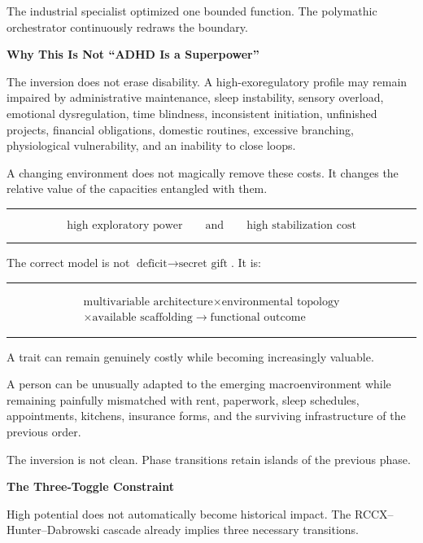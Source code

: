\documentclass[10pt]{article}
\newcommand{\ActiveAccent}{Industrial}
\newcommand{\papersection}[2]{%
  \Needspace{8\baselineskip}
  \vspace{1.1em}
  \noindent\begin{minipage}[t]{0.12\textwidth}
    \vspace{1pt}{\sffamily\bfseries\fontsize{17}{17}\selectfont\textcolor{\ActiveAccent}{#1}}
  \end{minipage}%
  \begin{minipage}[t]{0.86\textwidth}
    {\sffamily\bfseries\fontsize{16.2}{19}\selectfont #2}\par
    \vspace{0.35em}{\color{\ActiveAccent}\rule{\linewidth}{1.15pt}}
  \end{minipage}
  \vspace{0.55em}
}
\newenvironment{equationpanel}{\begin{center}\begin{minipage}{0.92\linewidth}\color{\ActiveAccent}\rule{\linewidth}{0.55pt}\par\vspace{-0.25em}\color{Ink}}{\vspace{-0.10em}\par\color{\ActiveAccent}\rule{\linewidth}{0.55pt}\end{minipage}\end{center}}
\begin{document}
The industrial specialist optimized one bounded function. The polymathic orchestrator continuously redraws the boundary.

\papersection{VIII}{Why This Is Not ``ADHD Is a Superpower''}

The inversion does not erase disability. A high-exoregulatory profile may remain impaired by administrative maintenance, sleep instability, sensory overload, emotional dysregulation, time blindness, inconsistent initiation, unfinished projects, financial obligations, domestic routines, excessive branching, physiological vulnerability, and an inability to close loops.

A changing environment does not magically remove these costs. It changes the relative value of the capacities entangled with them.

\begin{equationpanel}
\begin{equation*}
\text{high exploratory power}\qquad\text{and}\qquad\text{high stabilization cost}
\end{equation*}
\end{equationpanel}

The correct model is not $\text{deficit}\rightarrow\text{secret gift}$. It is:

\begin{equationpanel}
\begin{equation*}
\begin{gathered}
\text{multivariable architecture}\times\text{environmental topology}\\
\times\text{available scaffolding}\rightarrow\text{functional outcome}
\end{gathered}
\end{equation*}
\end{equationpanel}

A trait can remain genuinely costly while becoming increasingly valuable.

A person can be unusually adapted to the emerging macroenvironment while remaining painfully mismatched with rent, paperwork, sleep schedules, appointments, kitchens, insurance forms, and the surviving infrastructure of the previous order.

The inversion is not clean. Phase transitions retain islands of the previous phase.

\papersection{IX}{The Three-Toggle Constraint}

High potential does not automatically become historical impact. The RCCX--Hunter--Dabrowski cascade already implies three necessary transitions.
\end{document}
